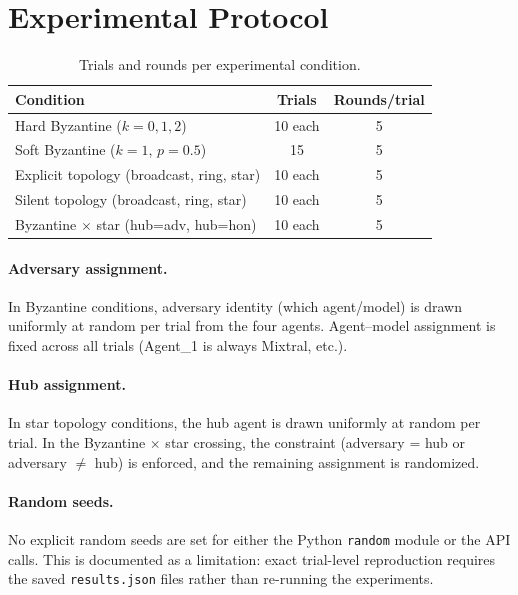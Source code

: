\section{Experimental Protocol}\label{app:protocol}

\begin{table}[h]
\centering
\caption{Trials and rounds per experimental condition.}\label{tab:protocol}
\smallskip
\begin{tabular}{@{}lcc@{}}
\toprule
Condition & Trials & Rounds/trial \\
\midrule
Hard Byzantine ($k{=}0, 1, 2$) & 10 each & 5 \\
Soft Byzantine ($k{=}1$, $p{=}0.5$) & 15 & 5 \\
Explicit topology (broadcast, ring, star) & 10 each & 5 \\
Silent topology (broadcast, ring, star) & 10 each & 5 \\
Byzantine $\times$ star (hub=adv, hub=hon) & 10 each & 5 \\
\bottomrule
\end{tabular}
\end{table}

\paragraph{Adversary assignment.}
In Byzantine conditions, adversary identity (which agent/model) is drawn uniformly at random per trial from the four agents.
Agent--model assignment is fixed across all trials (Agent\_1 is always Mixtral, etc.).

\paragraph{Hub assignment.}
In star topology conditions, the hub agent is drawn uniformly at random per trial.
In the Byzantine $\times$ star crossing, the constraint (adversary = hub or adversary $\neq$ hub) is enforced, and the remaining assignment is randomized.

\paragraph{Random seeds.}
No explicit random seeds are set for either the Python \texttt{random} module or the API calls.
This is documented as a limitation: exact trial-level reproduction requires the saved \texttt{results.json} files rather than re-running the experiments.

